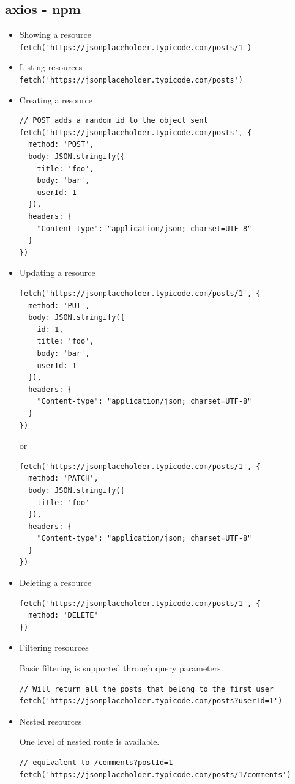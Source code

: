 \documentclass[a4paper, 12pt]{article}
\begin{document}
\subsection{axios - npm}
\begin{itemize}
\item Showing a resource\\
\verb|fetch('https://jsonplaceholder.typicode.com/posts/1')|

\item Listing resources\\
\verb|fetch('https://jsonplaceholder.typicode.com/posts')|

\item Creating a resource
\begin{verbatim}
// POST adds a random id to the object sent
fetch('https://jsonplaceholder.typicode.com/posts', {
  method: 'POST',
  body: JSON.stringify({
    title: 'foo',
    body: 'bar',
    userId: 1
  }),
  headers: {
    "Content-type": "application/json; charset=UTF-8"
  }
})
\end{verbatim}

\item Updating a resource
\begin{verbatim}
fetch('https://jsonplaceholder.typicode.com/posts/1', {
  method: 'PUT',
  body: JSON.stringify({
    id: 1,
    title: 'foo',
    body: 'bar',
    userId: 1
  }),
  headers: {
    "Content-type": "application/json; charset=UTF-8"
  }
})
\end{verbatim}
or
\begin{verbatim}
fetch('https://jsonplaceholder.typicode.com/posts/1', {
  method: 'PATCH',
  body: JSON.stringify({
    title: 'foo'
  }),
  headers: {
    "Content-type": "application/json; charset=UTF-8"
  }
})
\end{verbatim}

\item Deleting a resource
\begin{verbatim}
fetch('https://jsonplaceholder.typicode.com/posts/1', {
  method: 'DELETE'
})
\end{verbatim}

\item Filtering resources

Basic filtering is supported through query parameters.
\begin{verbatim}
// Will return all the posts that belong to the first user
fetch('https://jsonplaceholder.typicode.com/posts?userId=1')
\end{verbatim}

\item Nested resources

One level of nested route is available.
\begin{verbatim}
// equivalent to /comments?postId=1
fetch('https://jsonplaceholder.typicode.com/posts/1/comments')
\end{verbatim}


\end{itemize}
\end{document}
